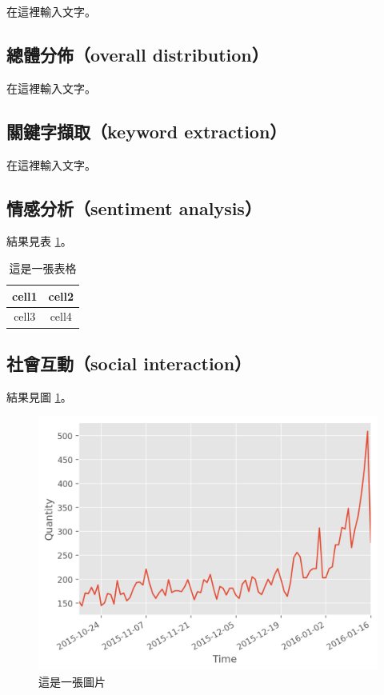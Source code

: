 \documentclass[letterpaper, 10pt, conference]{ieeeconf}   %
\begin{document}
\begin{CJK}{UTF8}{bsmi}
在這裡輸入文字。%

\subsection*{總體分佈（overall distribution）}

在這裡輸入文字。%

\subsection*{關鍵字擷取（keyword extraction）}

在這裡輸入文字。%

\subsection*{情感分析（sentiment analysis）}

結果見表 \ref{t1}。%

\begin{table}[!htbp]
\caption{這是一張表格}
\label{t1}
\begin{center}
\begin{tabular}{|c|c|}
\hline
cell1 & cell2 \\
\hline
cell3 & cell4 \\
\hline
\end{tabular}
\end{center}
\end{table}

\subsection*{社會互動（social interaction）}

結果見圖 \ref{f1}。%

\begin{figure}[!htbp]
\centering
\includegraphics[width=\columnwidth]{quantity_time_graph}
\caption{這是一張圖片}
\label{f1}
\end{figure}


\end{CJK}
\end{document}
